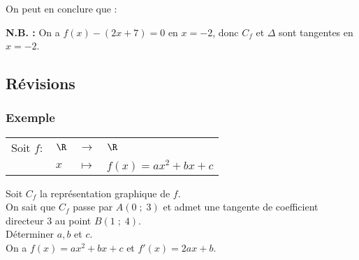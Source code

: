 \vspace*{.3cm}

On peut en conclure que : \\


\vspace*{.3cm}

\textbf{N.B. :} On a $f(x) - \left(2x+7\right) = 0$ en $x = -2$, donc $C_f$ et $\Delta$ sont tangentes en $x = -2$.

\vspace*{-5cm}

\newpage

\subsection{Révisions}

\subsubsection{Exemple }

\begin{tabular}{llll}
Soit $f:$ & $\R$ & $\longrightarrow$ & $\R$ \\
& $x$ & $\longmapsto$ & $f(x) = ax^2 + bx + c$ \\
\end{tabular}

\vspace*{.3cm}

Soit $C_f$ la représentation graphique de $f$. \\

On sait que $C_f$ passe par $A\left(0 \; ; \; 3\right)$ et admet une tangente de coefficient directeur $3$ au point $B\left(1 \; ; \; 4\right)$. \\

Déterminer $a, b$ et $c$. \\

On a $f(x) = ax^2 + bx + c$ et $f'(x) = 2ax + b$. \\

